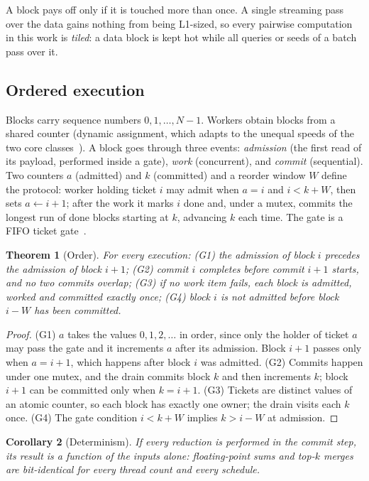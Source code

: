 \documentclass[10pt,twocolumn]{article}
\newtheorem{theorem}{Theorem}
\newtheorem{corollary}[theorem]{Corollary}
\theoremstyle{definition}
\theoremstyle{remark}
\begin{document}
A block pays off only if it is touched more than once.
A single streaming pass over the data gains nothing from being L1-sized, so every pairwise computation in this work is \emph{tiled}: a data block is kept hot while all queries or seeds of a batch pass over it.

\subsection{Ordered execution}
Blocks carry sequence numbers $0,1,\dots,N-1$.
Workers obtain blocks from a shared counter (dynamic assignment, which adapts to the unequal speeds of the two core classes~\cite{intel2021hybridwp}).
A block goes through three events: \emph{admission} (the first read of its payload, performed inside a gate), \emph{work} (concurrent), and \emph{commit} (sequential).
Two counters $a$ (admitted) and $k$ (committed) and a reorder window $W$ define the protocol:
worker holding ticket $i$ may admit when $a=i$ and $i<k+W$, then sets $a\leftarrow i+1$;
after the work it marks $i$ done and, under a mutex, commits the longest run of done blocks starting at $k$, advancing $k$ each time.
The gate is a FIFO ticket gate~\cite{mellorcrummey1991scalable}.

\begin{theorem}[Order]\label{thm:order}
For every execution:
(G1) the admission of block $i$ precedes the admission of block $i+1$;
(G2) commit $i$ completes before commit $i+1$ starts, and no two commits overlap;
(G3) if no work item fails, each block is admitted, worked and committed exactly once;
(G4) block $i$ is not admitted before block $i-W$ has been committed.
\end{theorem}
\begin{proof}
(G1) $a$ takes the values $0,1,2,\dots$ in order, since only the holder of ticket $a$ may pass the gate and it increments $a$ after its admission. Block $i+1$ passes only when $a=i+1$, which happens after block $i$ was admitted.
(G2) Commits happen under one mutex, and the drain commits block $k$ and then increments $k$; block $i+1$ can be committed only when $k=i+1$.
(G3) Tickets are distinct values of an atomic counter, so each block has exactly one owner; the drain visits each $k$ once.
(G4) The gate condition $i<k+W$ implies $k>i-W$ at admission.
\end{proof}

\begin{corollary}[Determinism]
If every reduction is performed in the commit step, its result is a function of the inputs alone: floating-point sums and top-$k$ merges are bit-identical for every thread count and every schedule.
\end{corollary}
\end{document}
